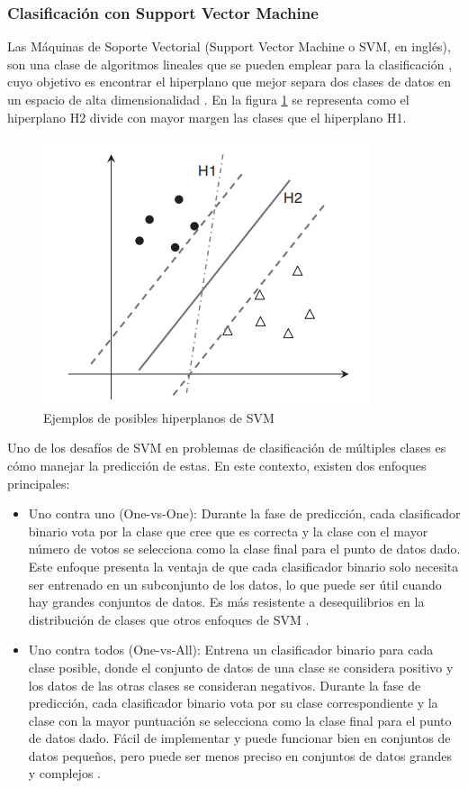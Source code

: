 \subsubsection{Clasificación con Support Vector Machine}
Las Máquinas de Soporte Vectorial (Support Vector Machine o SVM, en inglés), son una clase de algoritmos lineales que se pueden emplear para la clasificación \citep{sammut2011encyclopedia}, cuyo objetivo es encontrar el hiperplano que mejor separa dos clases de datos en un espacio de alta dimensionalidad \citep{guenther2016support}. En la figura \ref{fig:ejemplos-de-posibles-hiperplanos-de-svm} se representa como el hiperplano H2 divide con mayor margen las clases que el hiperplano H1.
\begin{figure}[H]
	\centering
	\includegraphics[width=0.4\linewidth]{"figuras/capi 1/Ejemplos de posibles hiperplanos de SVM"}
	\caption{Ejemplos de posibles hiperplanos de SVM \citep{sammut2011encyclopedia}}
	\label{fig:ejemplos-de-posibles-hiperplanos-de-svm}
\end{figure}
Uno de los desafíos de SVM en problemas de clasificación de múltiples clases es cómo manejar la predicción de estas. En este contexto, existen dos enfoques principales:
\begin{itemize}
	\item Uno contra uno (One-vs-One): Durante la fase de predicción, cada clasificador binario vota por la clase que cree que es correcta y la clase con el mayor número de votos se selecciona como la clase final para el punto de datos dado. Este enfoque presenta la ventaja de que cada clasificador binario solo necesita ser entrenado en un subconjunto de los datos, lo que puede ser útil cuando hay grandes conjuntos de datos. Es más resistente a desequilibrios en la distribución de clases que otros enfoques de SVM \citep{guenther2016support}.
	\item Uno contra todos (One-vs-All): Entrena un clasificador binario para cada clase posible, donde el conjunto de datos de una clase se considera positivo y los datos de las otras clases se consideran negativos. Durante la fase de predicción, cada clasificador binario vota por su clase correspondiente y la clase con la mayor puntuación se selecciona como la clase final para el punto de datos dado. Fácil de implementar y puede funcionar bien en conjuntos de datos pequeños, pero puede ser menos preciso en conjuntos de datos grandes y complejos \citep{guenther2016support}.
\end{itemize}
